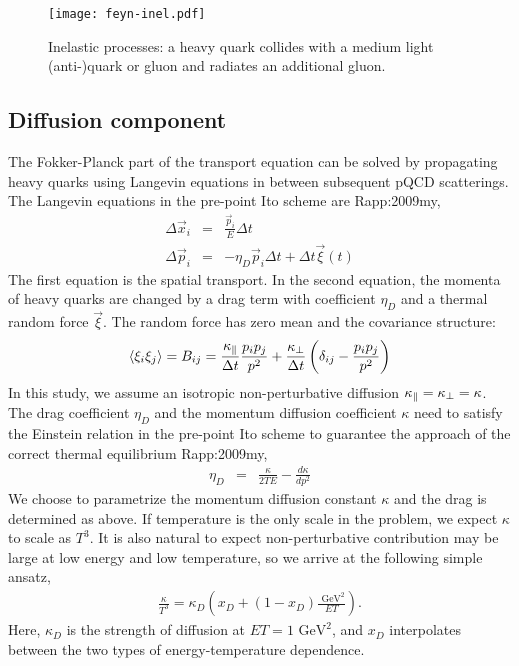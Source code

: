 \begin{figure}
\texttt{[image: feyn-inel.pdf]}
\caption{Inelastic processes: a heavy quark collides with a medium light (anti-)quark or gluon and radiates an additional gluon.}\label{plots:feyn-inelastic}
\end{figure}

\subsection{Diffusion component}
The Fokker-Planck part of the transport equation can be solved by propagating heavy quarks using Langevin equations in between subsequent pQCD scatterings.
The Langevin equations in the pre-point Ito scheme are {Rapp:2009my},
\begin{eqnarray}
\Delta \vec{x}_i &=& \frac{\vec{p}_i}{E} \Delta t	\\
\Delta \vec{p}_i &=& -\eta_D \vec{p}_i \Delta t + \Delta t \vec{\xi}(t)
\end{eqnarray}
The first equation is the spatial transport.
In the second equation, the momenta of heavy quarks are changed by a drag term with coefficient $\eta_D$ and a thermal random force $\vec{\xi}$. 
The random force has zero mean and the covariance structure:
\begin{eqnarray}
\langle \xi_i \xi_j \rangle = B_{ij} = \frac{\kappa_{\|}}{\Delta t} \frac{p_i p_j}{p^2} + \frac{\kappa_{\perp}}{\Delta t} \left(\delta_{ij} - \frac{p_i p_j}{p^2}\right)
\end{eqnarray}
In this study, we assume an isotropic non-perturbative diffusion $\kappa_{\|}=\kappa_{\perp}=\kappa$.
The drag coefficient $\eta_D$ and the momentum diffusion coefficient $\kappa$ need to satisfy the Einstein relation in the pre-point Ito scheme to guarantee the approach of the correct thermal equilibrium {Rapp:2009my},
\begin{eqnarray}
\eta_D &=& \frac{\kappa}{2TE} - \frac{d\kappa}{dp^2}
\end{eqnarray}
We choose to parametrize the momentum diffusion constant $\kappa$ and the drag is determined as above.
If temperature is the only scale in the problem, we expect $\kappa$ to scale as $T^3$.
It is also natural to expect non-perturbative contribution may be large at low energy and low temperature, so we arrive at the following simple ansatz,
\begin{eqnarray}
\frac{\kappa}{T^3} = \kappa_D\left(x_D + (1-x_D)\frac{\textrm{ GeV}^2}{ET}\right).
\end{eqnarray}
Here, $\kappa_D$ is the strength of diffusion at $ET = 1\textrm{ GeV}^2$, and $x_D$ interpolates between the two types of energy-temperature dependence.

